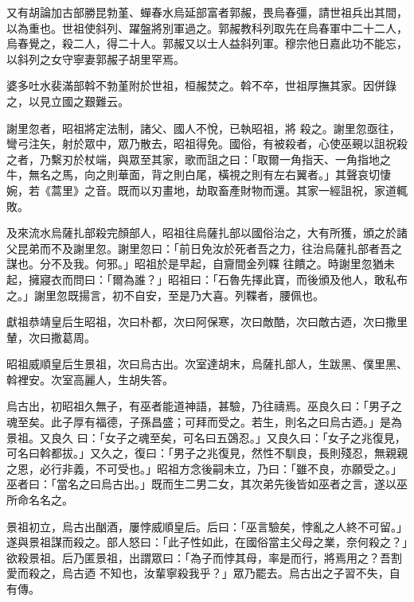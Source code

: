 \begin{pinyinscope}
 又有胡論加古部勝昆勃堇、蟬春水烏延部富者郭赧，畏烏春彊，請世祖兵出其間，以為重也。世祖使斜列、躍盤將別軍過之。郭赧教科列取先在烏春軍中二十二人，烏春覺之，殺二人，得二十人。郭赧又以士人益斜列軍。穆宗他日嘉此功不能忘，以斜列之女守寧妻郭赧子胡里罕焉。



 婆多吐水裴滿部斡不勃堇附於世祖，桓赧焚之。斡不卒，世祖厚撫其家。因併錄之，以見立國之艱難云。



 謝里忽者，昭祖將定法制，諸父、國人不悅，已執昭祖，將
 殺之。謝里忽亟往，彎弓注矢，射於眾中，眾乃散去，昭祖得免。國俗，有被殺者，心使巫覡以詛祝殺之者，乃繫刃於杖端，與眾至其家，歌而詛之曰：「取爾一角指天、一角指地之牛，無名之馬，向之則華面，背之則白尾，橫視之則有左右翼者。」其聲哀切悽婉，若《蒿里》之音。既而以刃畫地，劫取畜產財物而還。其家一經詛祝，家道輒敗。



 及來流水烏薩扎部殺完顏部人，昭祖往烏薩扎部以國俗治之，大有所獲，頒之於諸父昆弟而不及謝里忽。謝里忽曰：「前日免汝於死者吾之力，往治烏薩扎部者吾之謀也。分不及我。何邪。」昭祖於是早起，自齎間金列鞢
 往饋之。時謝里忽猶未起，擁寢衣而問曰：「爾為誰？」昭祖曰：「石魯先擇此寶，而後頒及他人，敢私布之。」謝里忽既揚言，初不自安，至是乃大喜。列鞢者，腰佩也。



 獻祖恭靖皇后生昭祖，次曰朴都，次曰阿保寒，次曰敵酷，次曰敵古迺，次曰撒里輦，次曰撒葛周。



 昭祖威順皇后生景祖，次曰烏古出。次室達胡末，烏薩扎部人，生跋黑、僕里黑、斡裡安。次室高麗人，生胡失答。



 烏古出，初昭祖久無子，有巫者能道神語，甚驗，乃往禱焉。巫良久曰：「男子之魂至矣。此子厚有福德，子孫昌盛；可拜而受之。若生，則名之曰烏古迺。」是為景祖。又良久
 曰：「女子之魂至矣，可名曰五鵶忍。」又良久曰：「女子之兆復見，可名曰斡都拔。」又久之，復曰：「男子之兆復見，然性不馴良，長則殘忍，無親親之恩，必行非義，不可受也。」昭祖方念後嗣未立，乃曰：「雖不良，亦願受之。」巫者曰：「當名之曰烏古出。」既而生二男二女，其次弟先後皆如巫者之言，遂以巫所命名名之。



 景祖初立，烏古出酗酒，屢悖威順皇后。后曰：「巫言驗矣，悖亂之人終不可留。」遂與景祖謀而殺之。部人怒曰：「此子性如此，在國俗當主父母之業，奈何殺之？」欲殺景祖。后乃匿景祖，出謂眾曰：「為子而悖其母，率是而行，將焉用之？吾割愛而殺之，烏古迺
 不知也，汝輩寧殺我乎？」眾乃罷去。烏古出之子習不失，自有傳。




\end{pinyinscope}
